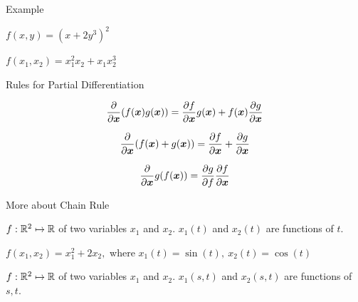 \documentclass[fleqn,aspectratio=169]{beamer}
\begin{document}
\begin{frame}{Example}

\plitemsep 0.1in

\bci 
\item \exam $f(x,y) = (x+2y^3)^2$

\item \exam $f(x_1, x_2) = x_1^2 x_2 + x_1 x_2^3$
\eci
\end{frame}

\begin{frame}{Rules for Partial Differentiation}

\plitemsep 0.2in

\bci 
\item {} $$\frac{\partial }{\partial \bm{x}}(f(\bm{x})g(\bm{x})) = \frac{\partial f}{\partial \bm{x}} g(\bm{x}) + f(\bm{x})\frac{\partial g}{\partial \bm{x}}$$

\item {} $$\frac{\partial }{\partial \bm{x}} (f(\bm{x})+ g(\bm{x})) = \frac{\partial f}{\partial \bm{x}} + \frac{\partial g}{\partial \bm{x}}$$

\item {} $$\frac{\partial }{\partial \bm{x}} g(f(\bm{x})) = \frac{\partial g}{\partial f}\frac{\partial f}{\partial \bm{x}}$$

\eci
\end{frame}

\begin{frame}{More about Chain Rule}

\plitemsep 0.05in

\bci 
\item $f: {\mathbb R}^2 \mapsto {\mathbb R}$ of two variables $x_1$ and $x_2.$ $x_1(t)$ and $x_2(t)$ are functions of $t.$
\item \exam $f(x_1, x_2) = x_1^2 + 2 x_2,$ where $x_1(t) = \sin(t),\ x_2(t)=\cos(t)$

\item $f: {\mathbb R}^2 \mapsto {\mathbb R}$ of two variables $x_1$ and $x_2.$ $x_1(s,t)$ and $x_2(s,t)$ are functions of $s,t.$

{
\small
\vspace{-0.2cm}
}
{
}
\eci
\end{frame}
\end{document}
